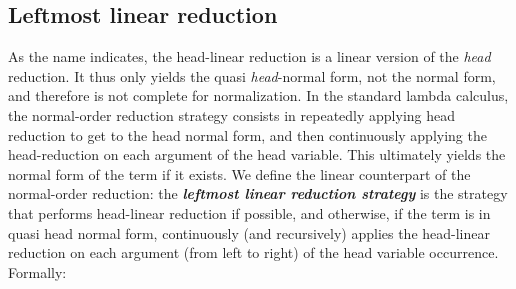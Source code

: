 \documentclass[xchauthor,chkrefs,GCNS,amsmath,amsthm,rotating,leaveRGB]{tcsg}
\renewcommand{\index}[1]{}
\theoremstyle{plain}
\theoremstyle{definition}
\begin{document}
\subsection{Leftmost linear reduction}\label{sec6.2}

As the name indicates, the head-linear reduction is a linear version of the
\emph{head} reduction. It thus only yields the quasi \emph{head}-normal form,
not the normal form, and therefore is not complete for normalization. In the
standard lambda calculus, the normal-order reduction strategy consists in
repeatedly applying head reduction to get to the head normal form, and then
continuously applying the head-reduction on each argument of the head
variable. This ultimately yields the normal form of the term if it exists. We
define the linear counterpart of the normal-order reduction: the
\textbf{\emph{leftmost linear reduction strategy}}\index{leftmost linear
reduction strategy} is the strategy that performs head-linear reduction if
possible, and otherwise, if the term is in quasi head normal form,
continuously (and recursively) applies the head-linear reduction on each
argument (from left to right) of the head variable occurrence. Formally:
\end{document}
